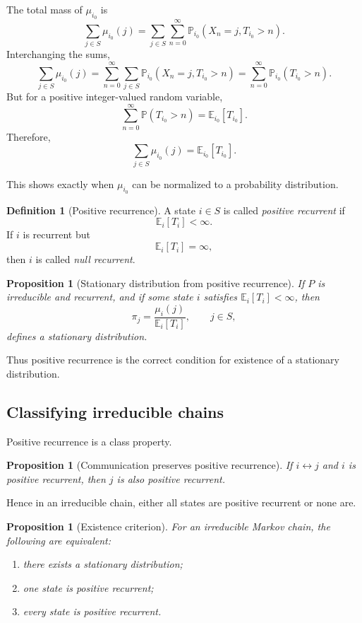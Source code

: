 \documentclass[11pt]{article}
\newtheorem{proposition}[theorem]{Proposition}
\theoremstyle{definition}
\newtheorem{definition}[theorem]{Definition}
\begin{document}
The total mass of \(\mu_{i_0}\) is
\[
\sum_{j\in S}\mu_{i_0}(j)
=
\sum_{j\in S}\sum_{n=0}^{\infty}
\mathbb P_{i_0}(X_n=j,T_{i_0}>n).
\]
Interchanging the sums,
\[
\sum_{j\in S}\mu_{i_0}(j)
=
\sum_{n=0}^{\infty}
\sum_{j\in S}\mathbb P_{i_0}(X_n=j,T_{i_0}>n)
=
\sum_{n=0}^{\infty}
\mathbb P_{i_0}(T_{i_0}>n).
\]
But for a positive integer-valued random variable,
\[
\sum_{n=0}^{\infty}\mathbb P(T_{i_0}>n)=\mathbb E_{i_0}[T_{i_0}].
\]
Therefore,
\[
\sum_{j\in S}\mu_{i_0}(j)=\mathbb E_{i_0}[T_{i_0}].
\]

This shows exactly when \(\mu_{i_0}\) can be normalized to a probability distribution.

\begin{definition}[Positive recurrence]
A state \(i\in S\) is called \emph{positive recurrent} if
\[
\mathbb E_i[T_i]<\infty.
\]
If \(i\) is recurrent but
\[
\mathbb E_i[T_i]=\infty,
\]
then \(i\) is called \emph{null recurrent}.
\end{definition}

\begin{proposition}[Stationary distribution from positive recurrence]
If \(P\) is irreducible and recurrent, and if some state \(i\) satisfies \(\mathbb E_i[T_i]<\infty\), then
\[
\pi_j = \frac{\mu_i(j)}{\mathbb E_i[T_i]},
\qquad j\in S,
\]
defines a stationary distribution.
\end{proposition}

Thus positive recurrence is the correct condition for existence of a stationary distribution.

\subsection{Classifying irreducible chains}

Positive recurrence is a class property.

\begin{proposition}[Communication preserves positive recurrence]
If \(i\leftrightarrow j\) and \(i\) is positive recurrent, then \(j\) is also positive recurrent.
\end{proposition}

Hence in an irreducible chain, either all states are positive recurrent or none are.

\begin{proposition}[Existence criterion]
For an irreducible Markov chain, the following are equivalent:
\begin{enumerate}[label=(\roman*)]
    \item there exists a stationary distribution;
    \item one state is positive recurrent;
    \item every state is positive recurrent.
\end{enumerate}
\end{proposition}
\end{document}
